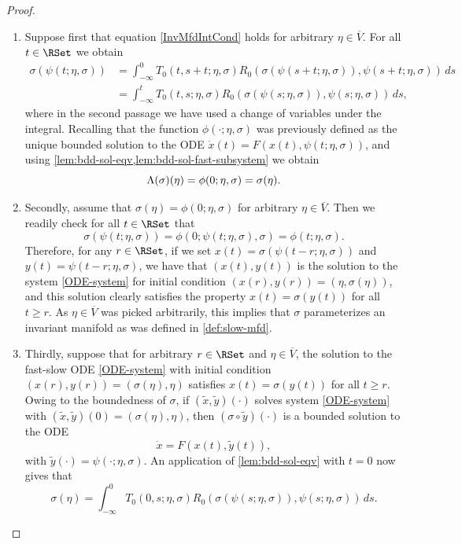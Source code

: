 \documentclass[a4paper]{siamart190516}
\begin{document}
 \begin{proof}
\begin{enumerate}
\item[$\mathrm{(1 \Rightarrow 2)}$] Suppose first that equation \cref{InvMfdIntCond}
  holds for arbitrary $\eta \in \overline{V}$. For all $t \in \RSet$ we obtain
\begin{align*}
\sigma(\psi(t;\eta,\sigma)) &= \int_{-\infty}^0 T_0(t,s+t;\eta,\sigma) R_0(\sigma(\psi(s+t;\eta,\sigma)),\psi(s+t;\eta,\sigma)) \, ds \\
&=  \int_{-\infty}^t T_0(t,s;\eta,\sigma)
R_0(\sigma(\psi(s;\eta,\sigma)),\psi(s;\eta,\sigma)) \, ds,
\end{align*}
where in the second passage we have used a change of variables under the integral.
Recalling that the function $\phi(\cdot;\eta,\sigma)$ was previously defined as the
unique bounded solution to the ODE $\dot{x}(t) = F(x(t),\psi(t;\eta,\sigma))$, and
using \cref{lem:bdd-sol-eqv,lem:bdd-sol-fast-subsystem} we obtain
 \[
\Lambda(\sigma)(\eta) = \phi(0; \eta, \sigma) = \sigma(\eta). \\
 \] 
\item[$\mathrm{(2 \Rightarrow 3)}$]    Secondly, assume that $\sigma(\eta) = \phi(0; \eta, \sigma)$ for arbitrary $\eta \in \overline{V}$. 
Then we readily check for all $t \in \RSet$ that
 \[
\sigma(\psi(t;\eta,\sigma)) = \phi(0; \psi(t;\eta,\sigma),\sigma) = \phi(t;\eta,\sigma).
 \]
Therefore, for any $r \in \RSet$, if we set $x(t) = \sigma(\psi(t-r;\eta,\sigma))$
and $y(t) = \psi(t-r;\eta,\sigma)$, we have that $(x(t), y(t))$ is the solution to
the system \cref{ODE-system} for initial condition $(x(r),y(r)) =
(\eta,\sigma(\eta))$, and this solution clearly satisfies the property $x(t) =
\sigma(y(t))$ for all $t \geq r$. As $\eta \in \overline{V}$ was picked arbitrarily,
this implies that $\sigma$ parameterizes an invariant manifold as was defined in \cref{def:slow-mfd}. \\
\item[$\mathrm{(3 \Rightarrow 1)}$]  Thirdly, suppose that for arbitrary $r \in
  \RSet$ and $\eta \in \overline{V}$, the solution to the fast-slow ODE
  \cref{ODE-system}  with initial condition $(x(r),y(r))=(\sigma(\eta),\eta)$
  satisfies $x(t) = \sigma(y(t))$ for all $t \geq r$. 
  Owing to the boundedness of $\sigma$, if $(\tilde{x},\tilde{y})(\cdot)$ solves
  system \cref{ODE-system} with $(\tilde{x},\tilde{y})(0) = (\sigma(\eta),\eta)$,
  then $(\sigma \circ \tilde{y})(\cdot)$ is a bounded solution to the ODE
\[
\dot{x} = F(x(t), \tilde{y}(t)),
\]
with $\tilde{y}(\cdot) = \psi(\cdot; \eta,\sigma)$. An application of 
\cref{lem:bdd-sol-eqv} with $t=0$ now gives that
\[
 \sigma(\eta) = \int_{-\infty}^0 T_0(0,s; \eta,\sigma) R_0(\sigma(\psi(s;\eta,\sigma)),\psi(s;\eta,\sigma)) \, ds.
\]
\end{enumerate}
 \end{proof}
 
\end{document}
